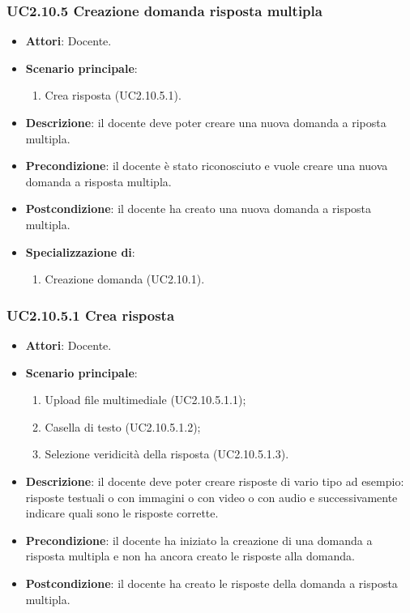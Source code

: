 \subsubsection{UC2.10.5 Creazione domanda risposta multipla}
\begin{itemize}
\item \textbf{Attori}: Docente.
\item \textbf{Scenario principale}:
\begin{enumerate}
\item Crea risposta (UC2.10.5.1).
\end{enumerate}
\item \textbf{Descrizione}: il docente deve poter creare una nuova domanda a riposta multipla.
\item \textbf{Precondizione}: il docente è stato riconosciuto e vuole creare una nuova domanda a risposta multipla.
\item \textbf{Postcondizione}: il docente ha creato una nuova domanda a risposta multipla.
\item \textbf{Specializzazione di}:
\begin{enumerate}
\item Creazione domanda (UC2.10.1).
\end{enumerate}
\end{itemize}
\subsubsection{UC2.10.5.1 Crea risposta}
\begin{itemize}
\item \textbf{Attori}: Docente.
\item \textbf{Scenario principale}:
\begin{enumerate}
\item Upload file multimediale (UC2.10.5.1.1);
\item Casella di testo (UC2.10.5.1.2);
\item Selezione veridicità della risposta (UC2.10.5.1.3).
\end{enumerate}
\item \textbf{Descrizione}: il docente deve poter creare risposte di vario tipo ad esempio: risposte testuali o con immagini o con video o con audio e successivamente indicare quali sono le risposte corrette.
\item \textbf{Precondizione}: il docente ha iniziato la creazione di una domanda a risposta multipla e non ha ancora creato le risposte alla domanda.
\item \textbf{Postcondizione}: il docente ha creato le risposte della domanda a risposta multipla.
\end{itemize}

